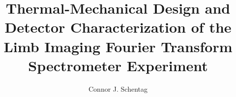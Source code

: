 \documentclass[12pt]{uofsthesis-cs}
\title{Thermal-Mechanical Design and Detector Characterization of the Limb Imaging Fourier Transform Spectrometer Experiment}
\author{Connor J. Schentag}
\begin{document}
\maketitle

\frontmatter








%

\uofsappendix

\begin{appendices}



\end{appendices}
\end{document}
